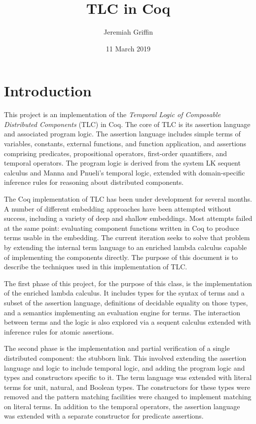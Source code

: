\documentclass[12pt]{article}
\title{TLC in Coq}
\author{Jeremiah Griffin}
\date{11 March 2019}
\begin{document}
\maketitle

\section{Introduction}

This project is an implementation of the \emph{Temporal Logic of
Composable Distributed Components} (TLC) in Coq.  The core of TLC is its
assertion language and associated program logic.  The assertion language
includes simple terms of variables, constants, external functions, and
function application, and assertions comprising predicates,
propositional operators, first-order quantifiers, and temporal
operators.  The program logic is derived from the system LK sequent
calculus and Manna and Pnueli's temporal logic, extended with
domain-specific inference rules for reasoning about distributed
components.

The Coq implementation of TLC has been under development for several
months.  A number of different embedding approaches have been attempted
without success, including a variety of deep and shallow embeddings.
Most attempts failed at the same point: evaluating component functions
written in Coq to produce terms usable in the embedding.  The current
iteration seeks to solve that problem by extending the internal term
language to an enriched lambda calculus capable of implementing the
components directly.  The purpose of this document is to describe the
techniques used in this implementation of TLC.

The first phase of this project, for the purpose of this class, is the
implementation of the enriched lambda calculus.  It includes types for
the syntax of terms and a subset of the assertion language, definitions
of decidable equality on those types, and a semantics implementing an
evaluation engine for terms.  The interaction between terms and the
logic is also explored via a sequent calculus extended with inference
rules for atomic assertions.

The second phase is the implementation and partial verification of a
single distributed component: the stubborn link.  This involved
extending the assertion language and logic to include temporal logic,
and adding the program logic and types and constructors specific to it.
The term language was extended with literal terms for unit, natural,
and Boolean types.  The constructors for these types were removed and
the pattern matching facilities were changed to implement matching on
literal terms.  In addition to the temporal operators, the assertion
language was extended with a separate constructor for predicate
assertions.
\end{document}
